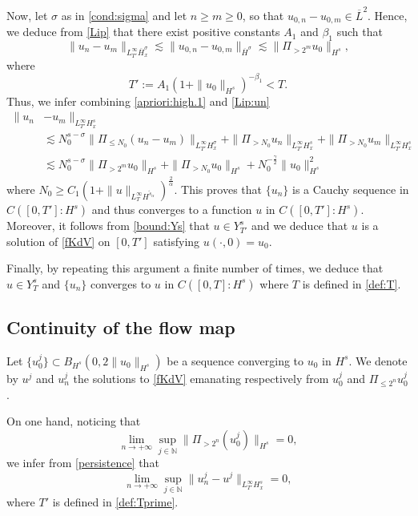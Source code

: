 \documentclass{amsart}
\theoremstyle{definition}
\theoremstyle{remark}
\numberwithin{equation}{section}
\begin{document}
Now, let $\sigma$ as in \eqref{cond:sigma} and let $n \ge m \ge 0$, so that $u_{0,n}-u_{0,m} \in \overline{L}^2$. Hence, we deduce from \eqref{Lip} that there exist positive constants $A_1$ and $\beta_1$ such that
\begin{equation} \label{Lip:un}
\|u_n-u_m\|_{L^\infty_{T'}\overline{H}^\sigma_x} \lesssim \|u_{0,n}-u_{0,m}\|_{\overline{H}^\sigma } \lesssim \|\Pi_{>2^m}u_0\|_{H^s } ,
\end{equation}
where 
\begin{equation}  \label{def:Tprime}
T':=A_1 (1+\|u_0\|_{H^s})^{-\beta_1}<T .
\end{equation} 
Thus, we infer combining \eqref{apriori:high.1} and \eqref{Lip:un} 
\begin{align} 
\|u_n&-u_m\|_{L^\infty_{T'}H^s_x}  \nonumber
\\ &\lesssim N_0^{s-\sigma}\|\Pi_{\le N_0}(u_n-u_m)\|_{L^\infty_{T'}H^\sigma_x}+\|\Pi_{>N_0}u_n\|_{L^\infty_{T'}H^s_x}+\|\Pi_{>N_0}u_m\|_{L^\infty_{T'}H^s_x} \nonumber
\\ &\lesssim N_0^{s-\sigma}\|\Pi_{>2^m}u_0\|_{H^s }+\|\Pi_{>N_0}u_0\|_{H^s}+N_0^{-\frac{\gamma}2}\|u_0\|_{H^{s}}^2  \label{persistence}
\end{align}
where $N_0\ge  C_1 (1+\|u\|_{L^\infty_TH^{\widetilde{s}_\alpha}})^{\frac 2 \alpha}$. This proves that $\{u_n\}$ is a Cauchy sequence in $C([0,T'] : H^s)$ and thus converges to a function $u$ in $C([0,T'] : H^s)$. Moreover, it follows from \eqref{bound:Ys} that $u \in Y^s_{T'}$ and we deduce that $u$ is a solution of \eqref{fKdV} on $[0,T']$ satisfying $u(\cdot,0)=u_0$. 

Finally, by repeating this argument a finite number of times, we deduce that $u \in Y^s_T$ and  $\{u_n\}$ converges to $u$ in  $C([0,T] : H^s)$ where $T$ is defined in \eqref{def:T}. 

\subsection{Continuity of the flow map} \label{64}
Let $\{u_{0}^j\} \subset B_{H^s}(0,2\|u_0\|_{H^s})$ be a sequence converging to $u_0$ in $H^s$. We denote by $u^j$ and $u_n^j$ the solutions to \eqref{fKdV} emanating respectively from $u_0^j$ and $\Pi_{\le 2^n}u_0^j$. 

On one hand, noticing that 
\begin{equation} \label{unif:conv}
\lim_{n \to +\infty} \sup_{j \in \mathbb N}\|\Pi_{>2^n}(u_0^j)\|_{H^s}=0 ,
\end{equation}
we infer from \eqref{persistence} that
\begin{equation} \label{unif:conv.2}
\lim_{n \to +\infty} \sup_{j \in \mathbb N}\|u_n^j-u^j\|_{L^\infty_{T'}H^s_x}=0 ,
\end{equation}
where $T'$ is defined in \eqref{def:Tprime}. 
\end{document}
